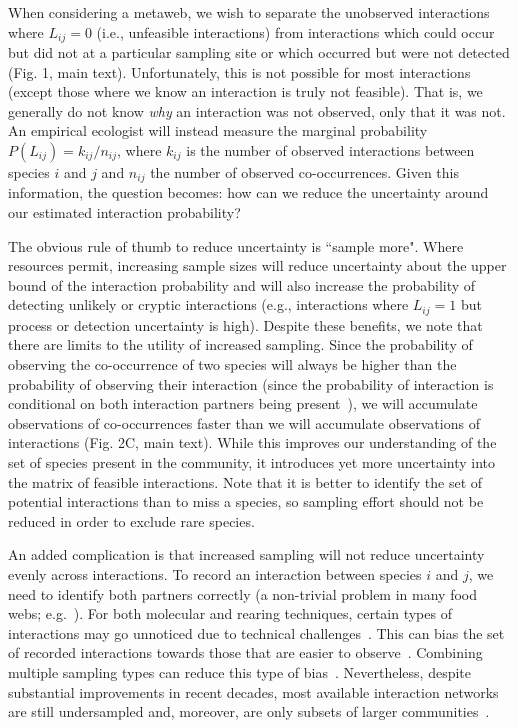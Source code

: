 \documentclass[12pt]{article}
\begin{document}
        When considering a metaweb, we wish to separate the unobserved interactions where $L_{ij} = 0$ (i.e., unfeasible interactions) from interactions which could occur but did not at a particular sampling site or which occurred but were not detected (Fig. 1, main text). Unfortunately, this is not possible for most interactions (except those where we know an interaction is truly not feasible). That is, we generally do not know \emph{why} an interaction was not observed, only that it was not. An empirical ecologist will instead measure the marginal probability $P(L_{ij}) = k_{ij}/n_{ij}$, where $k_{ij}$ is the number of observed interactions between species $i$ and $j$ and $n_{ij}$ the number of observed co-occurrences. Given this information, the question becomes: how can we reduce the uncertainty around our estimated interaction probability?


        The obvious rule of thumb to reduce uncertainty is ``sample more". Where resources permit, increasing sample sizes will reduce uncertainty about the upper bound of the interaction probability and will also increase the probability of detecting unlikely or cryptic interactions (e.g., interactions where $L_{ij} = 1$ but process or detection uncertainty is high). Despite these benefits, we note that there are limits to the utility of increased sampling. Since the probability of observing the co-occurrence of two species will always be higher than the probability of observing their interaction (since the probability of interaction is conditional on both interaction partners being present~\citep{Gravel2018}), we will accumulate observations of co-occurrences faster than we will accumulate observations of interactions (Fig. 2C, main text). While this improves our understanding of the set of species present in the community, it introduces yet more uncertainty into the matrix of feasible interactions. Note that it is better to identify the set of potential interactions than to miss a species, so sampling effort should not be reduced in order to exclude rare species.


        An added complication is that increased sampling will not reduce uncertainty evenly across interactions. To record an interaction between species $i$ and $j$, we need to identify both partners correctly (a non-trivial problem in many food webs; e.g.~\citealp{Kaartinen2011,Roslin2016}). For both molecular and rearing techniques, certain types of interactions may go unnoticed due to technical challenges~\citep{Wirta2014}. This can bias the set of recorded interactions towards those that are easier to observe~\citep{Carstensen2014,Jordano2016}. Combining multiple sampling types can reduce this type of bias~\citep{Wirta2014,Jordano2016}. Nevertheless, despite substantial improvements in recent decades, most available interaction networks are still undersampled and, moreover, are only subsets of larger communities~\citep{Bartomeus2013,Jordano2016}. 
\end{document}
